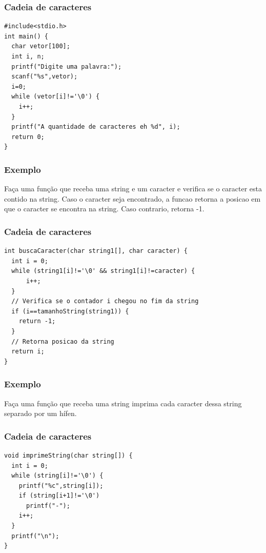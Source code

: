 \documentclass[aspectratio=169]{beamer}
\begin{document}

\begin{frame}[fragile]
\frametitle{Cadeia de caracteres}
\begin{lstlisting}
#include<stdio.h>
int main() {
  char vetor[100];
  int i, n;
  printf("Digite uma palavra:");
  scanf("%s",vetor);
  i=0;
  while (vetor[i]!='\0') {
    i++;
  }
  printf("A quantidade de caracteres eh %d", i);
  return 0;
}
\end{lstlisting}

\end{frame}

\begin{frame}[fragile]
\frametitle{Exemplo}
Faça uma função que receba uma string e um caracter e verifica se o caracter esta contido na string. Caso o caracter seja encontrado, a funcao retorna a posicao em que o caracter se encontra na string. Caso contrario, retorna -1.
\end{frame}


\begin{frame}[fragile]
\frametitle{Cadeia de caracteres}
\begin{lstlisting}
int buscaCaracter(char string1[], char caracter) {
  int i = 0;
  while (string1[i]!='\0' && string1[i]!=caracter) {
      i++;
  }
  // Verifica se o contador i chegou no fim da string
  if (i==tamanhoString(string1)) {
    return -1;
  }
  // Retorna posicao da string
  return i;
}
\end{lstlisting}
\end{frame}

\begin{frame}[fragile]
\frametitle{Exemplo}
Faça uma função que receba uma string imprima cada caracter dessa string separado por um hífen.
\end{frame}



\begin{frame}[fragile]
\frametitle{Cadeia de caracteres}
\begin{lstlisting}
void imprimeString(char string[]) {
  int i = 0;
  while (string[i]!='\0') {
    printf("%c",string[i]);
    if (string[i+1]!='\0')
      printf("-");
    i++;
  }
  printf("\n");
}
\end{lstlisting}
\end{frame}
\end{document}
